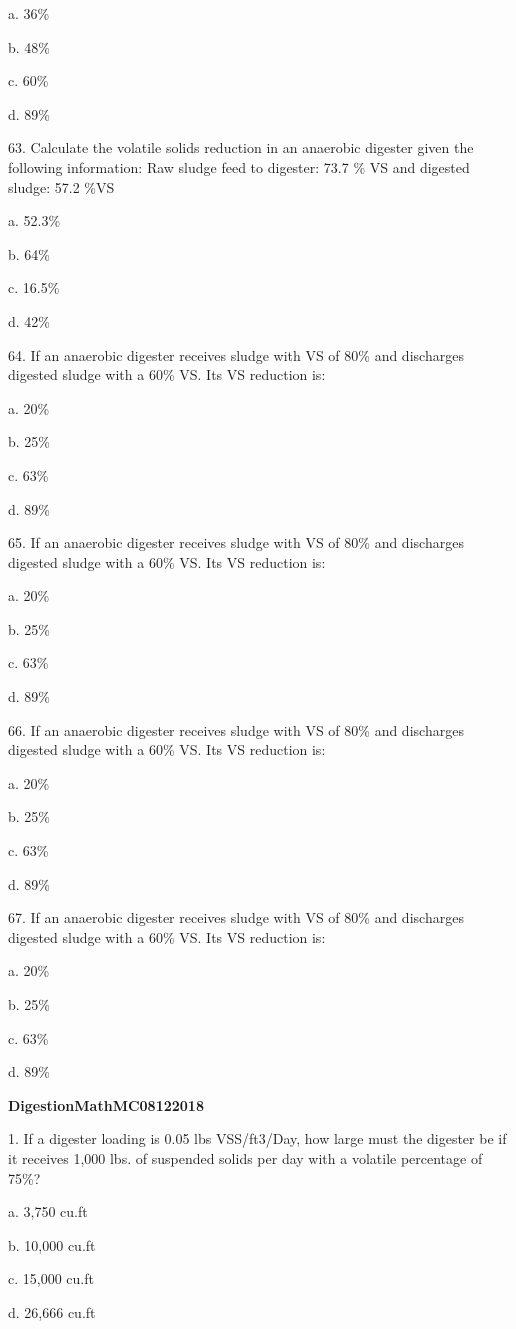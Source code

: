\documentclass{article}
\begin{document}
a. 36\% 

b. 48\% 

c. 60\% 

d. 89\% 


63. Calculate the volatile solids reduction in an anaerobic digester given the following information: Raw sludge feed to digester: 73.7 \% VS and digested sludge: 57.2 \%VS

a. 52.3\% 

b. 64\% 

c. 16.5\% 

d. 42\% 


64. If an anaerobic digester receives sludge with VS of 80\% and discharges digested sludge with a 60\% VS. Its VS reduction is:

a. 20\% 

b. 25\% 

c. 63\% 

d. 89\% 


65. If an anaerobic digester receives sludge with VS of 80\% and discharges digested sludge with a 60\% VS. Its VS reduction is:

a. 20\% 

b. 25\% 

c. 63\% 

d. 89\% 


66. If an anaerobic digester receives sludge with VS of 80\% and discharges digested sludge with a 60\% VS. Its VS reduction is:

a. 20\% 

b. 25\% 

c. 63\% 

d. 89\% 


67. If an anaerobic digester receives sludge with VS of 80\% and discharges digested sludge with a 60\% VS. Its VS reduction is:

a. 20\% 

b. 25\% 

c. 63\% 

d. 89\% 


\textbf{DigestionMathMC08122018}

1. If a digester loading is 0.05 lbs VSS/ft3/Day, how large must the digester be if it receives 1,000 lbs. of suspended solids per day with a volatile percentage of 75\%? 

a. 3,750 cu.ft 

b. 10,000 cu.ft 

c. 15,000 cu.ft 

d. 26,666 cu.ft 
\end{document}
